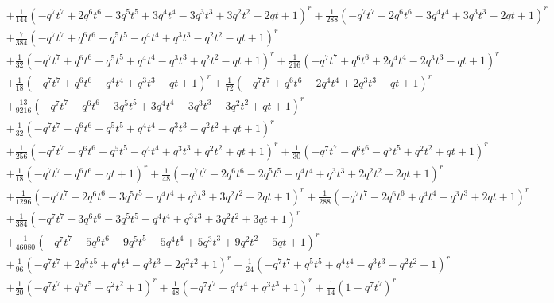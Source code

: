 \documentclass[11pt,english]{amsart}
\numberwithin{equation}{section}
\numberwithin{figure}{section}
\theoremstyle{plain}
\theoremstyle{plain}
\theoremstyle{definition}
\theoremstyle{remark}
\begin{document}
{\begin{align*}
& + \frac{1}{144} {\left(-q^{7} t^{7} + 2 q^{6} t^{6} - 3 q^{5} t^{5} + 3 q^{4} t^{4} - 3 q^{3} t^{3} + 3 q^{2} t^{2} - 2 q t + 1\right)}^{r} + \frac{1}{288} {\left(-q^{7} t^{7} + 2 q^{6} t^{6} - 3 q^{4} t^{4} + 3 q^{3} t^{3} - 2 q t + 1\right)}^{r} \\
& + \frac{7}{384} {\left(-q^{7} t^{7} + q^{6} t^{6} + q^{5} t^{5} - q^{4} t^{4} + q^{3} t^{3} - q^{2} t^{2} - q t + 1\right)}^{r} \\
& + \frac{1}{32} {\left(-q^{7} t^{7} + q^{6} t^{6} - q^{5} t^{5} + q^{4} t^{4} - q^{3} t^{3} + q^{2} t^{2} - q t + 1\right)}^{r} + \frac{1}{216} {\left(-q^{7} t^{7} + q^{6} t^{6} + 2 q^{4} t^{4} - 2 q^{3} t^{3} - q t + 1\right)}^{r} \\
& + \frac{1}{18} {\left(-q^{7} t^{7} + q^{6} t^{6} - q^{4} t^{4} + q^{3} t^{3} - q t + 1\right)}^{r} + \frac{1}{72} {\left(-q^{7} t^{7} + q^{6} t^{6} - 2 q^{4} t^{4} + 2 q^{3} t^{3} - q t + 1\right)}^{r} \\
& + \frac{13}{9216} {\left(-q^{7} t^{7} - q^{6} t^{6} + 3 q^{5} t^{5} + 3 q^{4} t^{4} - 3 q^{3} t^{3} - 3 q^{2} t^{2} + q t + 1\right)}^{r} \\
& + \frac{1}{32} {\left(-q^{7} t^{7} - q^{6} t^{6} + q^{5} t^{5} + q^{4} t^{4} - q^{3} t^{3} - q^{2} t^{2} + q t + 1\right)}^{r} \\
& + \frac{1}{256} {\left(-q^{7} t^{7} - q^{6} t^{6} - q^{5} t^{5} - q^{4} t^{4} + q^{3} t^{3} + q^{2} t^{2} + q t + 1\right)}^{r} + \frac{1}{30} {\left(-q^{7} t^{7} - q^{6} t^{6} - q^{5} t^{5} + q^{2} t^{2} + q t + 1\right)}^{r} \\
& + \frac{1}{18} {\left(-q^{7} t^{7} - q^{6} t^{6} + q t + 1\right)}^{r} + \frac{1}{48} {\left(-q^{7} t^{7} - 2 q^{6} t^{6} - 2 q^{5} t^{5} - q^{4} t^{4} + q^{3} t^{3} + 2 q^{2} t^{2} + 2 q t + 1\right)}^{r} \\
& + \frac{1}{1296} {\left(-q^{7} t^{7} - 2 q^{6} t^{6} - 3 q^{5} t^{5} - q^{4} t^{4} + q^{3} t^{3} + 3 q^{2} t^{2} + 2 q t + 1\right)}^{r} + \frac{1}{288} {\left(-q^{7} t^{7} - 2 q^{6} t^{6} + q^{4} t^{4} - q^{3} t^{3} + 2 q t + 1\right)}^{r} \\
& + \frac{1}{384} {\left(-q^{7} t^{7} - 3 q^{6} t^{6} - 3 q^{5} t^{5} - q^{4} t^{4} + q^{3} t^{3} + 3 q^{2} t^{2} + 3 q t + 1\right)}^{r} \\
& + \frac{1}{46080} {\left(-q^{7} t^{7} - 5 q^{6} t^{6} - 9 q^{5} t^{5} - 5 q^{4} t^{4} + 5 q^{3} t^{3} + 9 q^{2} t^{2} + 5 q t + 1\right)}^{r} \\
& + \frac{1}{96} {\left(-q^{7} t^{7} + 2 q^{5} t^{5} + q^{4} t^{4} - q^{3} t^{3} - 2 q^{2} t^{2} + 1\right)}^{r} + \frac{1}{24} {\left(-q^{7} t^{7} + q^{5} t^{5} + q^{4} t^{4} - q^{3} t^{3} - q^{2} t^{2} + 1\right)}^{r} \\
& + \frac{1}{20} {\left(-q^{7} t^{7} + q^{5} t^{5} - q^{2} t^{2} + 1\right)}^{r} + \frac{1}{48} {\left(-q^{7} t^{7} - q^{4} t^{4} + q^{3} t^{3} + 1\right)}^{r} + \frac{1}{14} {\left(1-q^{7} t^{7}\right)}^{r}
\end{align*}}
\end{document}
